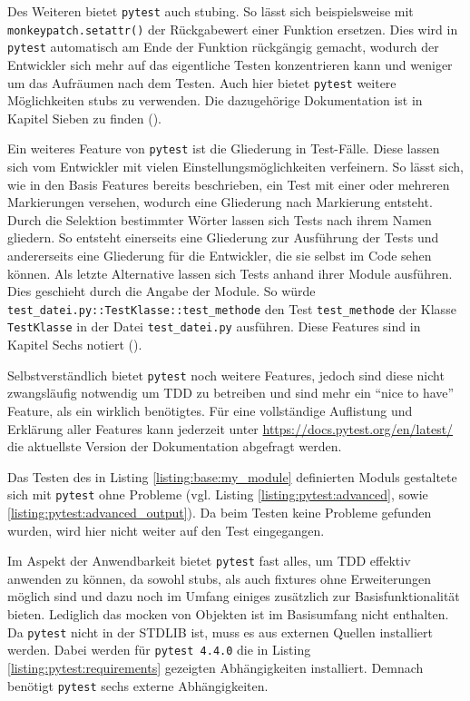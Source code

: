 Des Weiteren bietet \lstinline{pytest} auch \gls{stub}ing. So lässt sich
beispielsweise mit \lstinline{monkeypatch.setattr()} der Rückgabewert einer
Funktion ersetzen. Dies wird in \lstinline{pytest} automatisch am Ende der
Funktion rückgängig gemacht, wodurch der Entwickler sich mehr auf das
eigentliche Testen konzentrieren kann und weniger um das Aufräumen nach dem
Testen. Auch hier bietet \lstinline{pytest} weitere Möglichkeiten \Glspl{stub}
zu verwenden. Die dazugehörige Dokumentation ist in Kapitel Sieben zu finden
(\cite{docs.pytest.org:4.4}).
\newline

Ein weiteres Feature von \lstinline{pytest} ist die Gliederung in Test-Fälle.
Diese lassen sich vom Entwickler mit vielen Einstellungsmöglichkeiten
verfeinern. So lässt sich, wie in den Basis Features bereits beschrieben, ein
Test mit einer oder mehreren Markierungen versehen, wodurch eine Gliederung nach
Markierung entsteht. Durch die Selektion bestimmter Wörter lassen sich
Tests nach ihrem Namen gliedern. So entsteht einerseits eine Gliederung zur
Ausführung der Tests und andererseits eine Gliederung für die Entwickler, die
sie selbst im Code sehen können. Als letzte Alternative lassen sich Tests anhand
ihrer Module ausführen. Dies geschieht durch die Angabe der Module. So würde
\lstinline{test_datei.py::TestKlasse::test_methode} den Test
\lstinline{test_methode} der Klasse \lstinline{TestKlasse} in der Datei
\lstinline{test_datei.py} ausführen. Diese Features sind in Kapitel Sechs
notiert (\cite{docs.pytest.org:4.4}).
\newline

Selbstverständlich bietet \lstinline{pytest} noch weitere Features, jedoch sind
diese nicht zwangsläufig notwendig um TDD zu betreiben und sind mehr ein "`nice
to have"' Feature, als ein wirklich benötigtes. Für eine vollständige
Auflistung und Erklärung aller Features kann jederzeit unter
\url{https://docs.pytest.org/en/latest/} die aktuellste Version der
Dokumentation abgefragt werden.
\newline

Das Testen des in Listing \ref{listing:base:my_module} definierten Moduls
gestaltete sich mit \lstinline{pytest} ohne Probleme (vgl. Listing
\ref{listing:pytest:advanced}, sowie \ref{listing:pytest:advanced_output}). Da
beim Testen keine Probleme gefunden wurden,  wird hier nicht weiter auf den
Test eingegangen.

Im Aspekt der Anwendbarkeit bietet \lstinline{pytest} fast alles, um TDD 
effektiv anwenden zu können, da sowohl \Glspl{stub}, als auch \Glspl{fixture} 
ohne Erweiterungen möglich sind und dazu noch im Umfang einiges zusätzlich zur
Basisfunktionalität bieten. Lediglich das \Gls{mock}en von Objekten ist im 
Basisumfang nicht enthalten. Da \lstinline{pytest} nicht in der STDLIB ist, muss
es aus externen Quellen installiert werden. Dabei werden für
\lstinline{pytest 4.4.0} die in Listing \ref{listing:pytest:requirements}
gezeigten Abhängigkeiten installiert. Demnach benötigt \lstinline{pytest} sechs
externe Abhängigkeiten.

